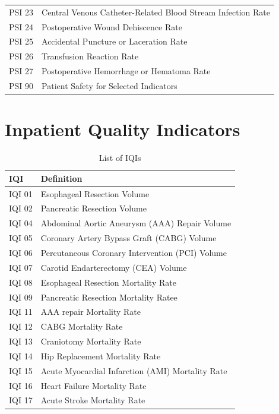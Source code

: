 \documentclass{article}
\begin{document}
\begin{appendix}
\begin{center}
{\begin{longtable}{l| l{800pt}}
        PSI 23 & Central Venous Catheter-Related Blood Stream Infection Rate\\
        PSI 24 & Postoperative Wound Dehiscence Rate\\
        PSI 25 & Accidental Puncture or Laceration Rate\\
        PSI 26 & Transfusion Reaction Rate\\
        PSI 27 & Postoperative Hemorrhage or Hematoma Rate\\
        PSI 90 & Patient Safety for Selected Indicators\\
    \end{longtable}}
    \label{tab:symbol_def}
\end{center}
\newpage
\section{Inpatient Quality Indicators}
 \begin{center}
 {\renewcommand{\arraystretch}{1.2}%
    \begin{longtable}{l| l{800pt}}
      \caption{List of IQIs}\\
        \textbf{IQI} & \textbf{Definition} \\
        \hline
        IQI 01 & Esophageal Resection Volume\\
        IQI 02 & Pancreatic Resection Volume\\
        IQI 04 & Abdominal Aortic Aneurysm (AAA) Repair Volume\\
        IQI 05 & Coronary Artery Bypass Graft (CABG) Volume\\
        IQI 06 & Percutaneous Coronary Intervention (PCI) Volume\\
        IQI 07 & Carotid Endarterectomy (CEA) Volume \\
        IQI 08 & Esophageal Resection Mortality Rate\\
        IQI 09 & Pancreatic Resection Mortality Ratee\\
        IQI 11 & AAA repair Mortality Rate\\
        IQI 12 & CABG Mortality Rate\\
        IQI 13 & Craniotomy Mortality Rate\\
        IQI 14 & Hip Replacement Mortality Rate\\
        IQI 15 & Acute Myocardial Infarction (AMI) Mortality Rate\\
        IQI 16 & Heart Failure Mortality Rate\\
        IQI 17 & Acute Stroke Mortality Rate\\

\end{longtable}}
\end{center}
\end{appendix}
\end{document}
